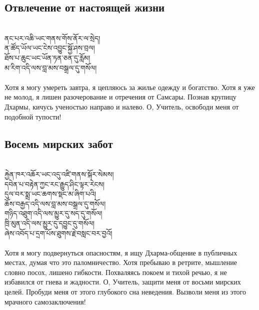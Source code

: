 \newpage
\subsection*{Отвлечение от настоящей жизни}
\\
\ti
ནང་པར་འཆི་ཡང་གནས་གོས་ནོར་ལ་སྲེད།\\
ན་ཚོད་ཡོལ་ཡང་ངེས་འབྱུང་སྐྱོ་ཤས་བྲལ། \\
ཐོས་པ་ཆུང་ཡང་ཡོན་ཏན་ཅན་དུ་རློམ། \\
མ་རིག་འདི་ལས་བླ་མས་བསྒྲལ་དུ་གསོལ།\\
\\
\ru
Хотя я могу умереть завтра, я цепляюсь за жилье одежду и богатство. Хотя я уже не молод, я лишен разочерование и отречения от Самсары. Познав крупицу Дхармы, кичусь ученостью направо и налево.
О, Учитель, освободи меня от подобной тупости!

\subsection*{Восемь мирских забот}
\\
\ti
རྐྱེན་ཁར་འཆོར་ཡང་འདུ་འཛི་གནས་སྐོར་སེམས།\\
དབེན་པ་བརྟེན་ཀྱང་རང་རྒྱུད་ཤིང་ལྟར་རེངས། \\
དུལ་བར་སྨྲ་ཡང་ཆགས་སྡང་མ་ཞིག་པའི། \\
ཆོས་བརྒྱད་འདི་ལས་བླ་མས་བསྒྲལ་དུ་གསོལ། \\
གཉིད་འཐུག་འདི་ལས་མྱུར་དུ་སད་དུ་གསོལ། \\
ཁྲི་མུན་འདི་ལས་མྱུར་དུ་དབྱུང་དུ་གསོལ། \\
ཞེས་འབོད་པ་དྲག་པོས་ཐུགས་རྗེ་བསླང་བར་བྱའོ།\\
\\
\ru
Хотя я могу подвернуться опасностям, я ищу Дхарма-общение
в публичных местах, думая что это паломничество.
Хотя пребываю в ретрите, мышление словно посох, лишено гибкости. Похваляясь покоем и тихой речью, я не избавился от гнева и жадности. О, Учитель, защити меня от восьми мирских целей.
Пробуди меня от этого глубокого сна неведения.
Вызволи меня из этого мрачного самозаключения!
